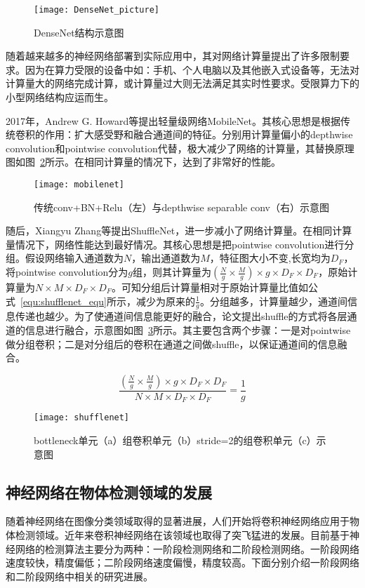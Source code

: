\begin{figure}[htp]
\centering
\texttt{[image: DenseNet\_picture]}
\caption{DenseNet结构示意图}
\label{fig:DenseNet_picture}
\end{figure}
随着越来越多的神经网络部署到实际应用中，其对网络计算量提出了许多限制要求。因为在算力受限的设备中如：手机、个人电脑以及其他嵌入式设备等，无法对计算量大的网络完成计算，或计算量过大则无法满足其实时性要求。受限算力下的小型网络结构应运而生。

2017年，Andrew G. Howard等提出轻量级网络MobileNet。其核心思想是根据传统卷积的作用：扩大感受野和融合通道间的特征。分别用计算量偏小的depthwise convolution和pointwise convolution代替，极大减少了网络的计算量，其替换原理图如图~\ref{fig:mobilenet}所示。在相同计算量的情况下，达到了非常好的性能。

\begin{figure}[htp]
\centering
\texttt{[image: mobilenet]}
\caption{传统conv+BN+Relu（左）与depthwise separable conv（右）示意图}
\label{fig:mobilenet}
\end{figure}
随后，Xiangyu Zhang等提出ShuffleNet，进一步减小了网络计算量。在相同计算量情况下，网络性能达到最好情况。其核心思想是把pointwise convolution进行分组。假设网络输入通道数为$N$，输出通道数为$M$，特征图大小不变,长宽均为$D_{F}$，将pointwise convolution分为$g$组，则其计算量为$(\frac{N}{g}\times\frac{M}{g})\times g\times D_{F}\times D_{F}$，原始计算量为$N\times M\times D_{F}\times D_{F}$。可知分组后计算量相对于原始计算量比值如公式~\ref{equ:shufflenet_equ}所示，减少为原来的$\frac{1}{g}$。分组越多，计算量越少，通道间信息传递也越少。为了使通道间信息能更好的融合，论文提出shuffle的方式将各层通道的信息进行融合，示意图如图~\ref{fig:shufflenet}所示。其主要包含两个步骤：一是对pointwise做分组卷积；二是对分组后的卷积在通道之间做shuffle，以保证通道间的信息融合。

\begin{equation}
\label{equ:shufflenet_equ}
\frac{(\frac{N}{g}\times\frac{M}{g})\times g\times D_{F}\times D_{F}}{N\times M\times D_{F}\times D_{F}}=\frac{1}{g}
\end{equation}

\begin{figure}[htp]
\centering
\texttt{[image: shufflenet]}
\caption{bottleneck单元（a）组卷积单元（b）stride=2的组卷积单元（c）示意图}
\label{fig:shufflenet}
\end{figure}
\subsection{神经网络在物体检测领域的发展}
随着神经网络在图像分类领域取得的显著进展，人们开始将卷积神经网络应用于物体检测领域。近年来卷积神经网络在该领域也取得了突飞猛进的发展。目前基于神经网络的检测算法主要分为两种：一阶段检测网络和二阶段检测网络。一阶段网络速度较快，精度偏低；二阶段网络速度偏慢，精度较高。下面分别介绍一阶段网络和二阶段网络中相关的研究进展。

